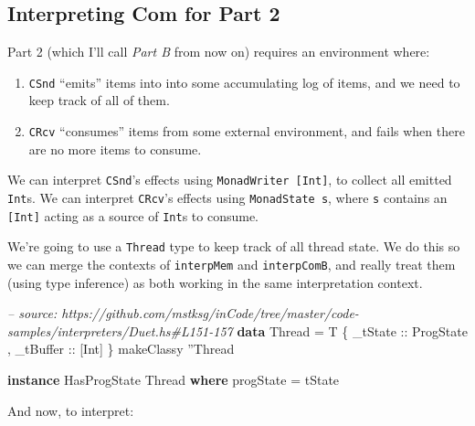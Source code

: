 \documentclass[]{article}
\newenvironment{Shaded}{}{}
\newcommand{\KeywordTok}[1]{\textcolor[rgb]{0.00,0.44,0.13}{\textbf{#1}}}
\newcommand{\DataTypeTok}[1]{\textcolor[rgb]{0.56,0.13,0.00}{#1}}
\newcommand{\CharTok}[1]{\textcolor[rgb]{0.25,0.44,0.63}{#1}}
\newcommand{\CommentTok}[1]{\textcolor[rgb]{0.38,0.63,0.69}{\textit{#1}}}
\newcommand{\OtherTok}[1]{\textcolor[rgb]{0.00,0.44,0.13}{#1}}
\newcommand{\FunctionTok}[1]{\textcolor[rgb]{0.02,0.16,0.49}{#1}}
\newcommand{\NormalTok}[1]{#1}
\begin{document}
\subsection{Interpreting Com for Part 2}\label{interpreting-com-for-part-2}

Part 2 (which I'll call \emph{Part B} from now on) requires an environment
where:

\begin{enumerate}
\def\labelenumi{\arabic{enumi}.}
\tightlist
\item
  \texttt{CSnd} ``emits'' items into into some accumulating log of items, and we
  need to keep track of all of them.
\item
  \texttt{CRcv} ``consumes'' items from some external environment, and fails
  when there are no more items to consume.
\end{enumerate}

We can interpret \texttt{CSnd}'s effects using \texttt{MonadWriter\ {[}Int{]}},
to collect all emitted \texttt{Int}s. We can interpret \texttt{CRcv}'s effects
using \texttt{MonadState\ s}, where \texttt{s} contains an \texttt{{[}Int{]}}
acting as a source of \texttt{Int}s to consume.

We're going to use a \texttt{Thread} type to keep track of all thread state. We
do this so we can merge the contexts of \texttt{interpMem} and
\texttt{interpComB}, and really treat them (using type inference) as both
working in the same interpretation context.

\begin{Shaded}
\begin{Highlighting}[]
\CommentTok{-- source: https://github.com/mstksg/inCode/tree/master/code-samples/interpreters/Duet.hs#L151-157}
\KeywordTok{data} \DataTypeTok{Thread} \FunctionTok{=} \DataTypeTok{T}\NormalTok{ \{}\OtherTok{ _tState   ::} \DataTypeTok{ProgState}
\NormalTok{                ,}\OtherTok{ _tBuffer  ::}\NormalTok{ [}\DataTypeTok{Int}\NormalTok{]}
\NormalTok{                \}}
\NormalTok{makeClassy }\CharTok{''}\DataTypeTok{Thread}

\KeywordTok{instance} \DataTypeTok{HasProgState} \DataTypeTok{Thread} \KeywordTok{where}
\NormalTok{    progState }\FunctionTok{=}\NormalTok{ tState}
\end{Highlighting}
\end{Shaded}

And now, to interpret:
\end{document}
